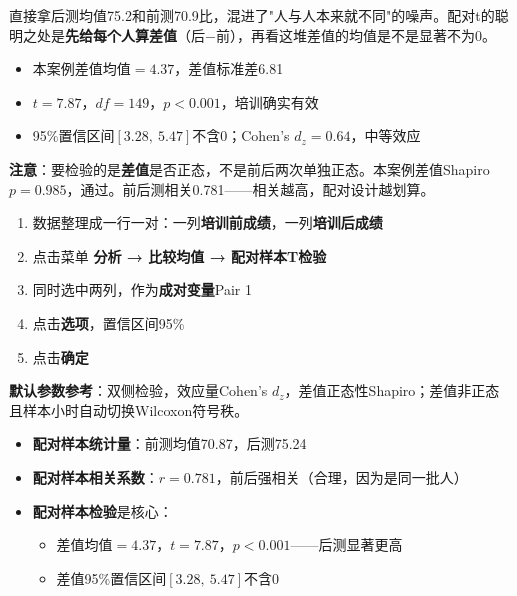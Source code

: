 \begin{algoprinciple}
直接拿后测均值75.2和前测70.9比，混进了"人与人本来就不同"的噪声。配对t的聪明之处是\textbf{先给每个人算差值}（后$-$前），再看这堆差值的均值是不是显著不为0。

\begin{itemize}
    \item 本案例差值均值$=4.37$，差值标准差6.81
    \item $t=7.87$，$df=149$，$p<0.001$，培训确实有效
    \item 95\%置信区间$[3.28,\ 5.47]$不含0；Cohen's $d_z=0.64$，中等效应
\end{itemize}

\textbf{注意}：要检验的是\textbf{差值}是否正态，不是前后两次单独正态。本案例差值Shapiro $p=0.985$，通过。前后测相关0.781——相关越高，配对设计越划算。
\end{algoprinciple}

\begin{algosposs}
\begin{enumerate}
    \item 数据整理成一行一对：一列\textbf{培训前成绩}，一列\textbf{培训后成绩}
    \item 点击菜单 \textbf{分析 → 比较均值 → 配对样本T检验}
    \item 同时选中两列，作为\textbf{成对变量}Pair 1
    \item 点击\textbf{选项}，置信区间95\%
    \item 点击\textbf{确定}
\end{enumerate}

\textbf{默认参数参考}：双侧检验，效应量Cohen's $d_z$，差值正态性Shapiro；差值非正态且样本小时自动切换Wilcoxon符号秩。
\end{algosposs}

\begin{algoresult}
\begin{itemize}
    \item \textbf{配对样本统计量}：前测均值70.87，后测75.24
    \item \textbf{配对样本相关系数}：$r=0.781$，前后强相关（合理，因为是同一批人）
    \item \textbf{配对样本检验}是核心：
    \begin{itemize}
        \item 差值均值$=4.37$，$t=7.87$，$p<0.001$——后测显著更高
        \item 差值95\%置信区间$[3.28,\ 5.47]$不含0
    \end{itemize}
\end{itemize}
\end{algoresult}

